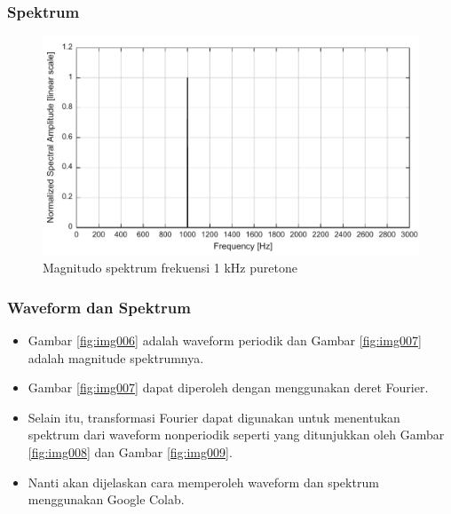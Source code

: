 \documentclass[pdflatex,compress]{beamer}
\begin{document}
\begin{frame}
	\frametitle{Spektrum}
	\begin{figure}
		\centering
		\includegraphics[width=0.7\linewidth]{img/img005}
		\caption{Magnitudo spektrum frekuensi 1 kHz puretone}
		\label{fig:img005}
	\end{figure}
\end{frame}

\begin{frame}
	\frametitle{Waveform dan Spektrum}
	\begin{itemize}
		\item Gambar \ref{fig:img006} adalah waveform periodik dan Gambar \ref{fig:img007} adalah magnitude spektrumnya.
		\item Gambar \ref{fig:img007} dapat diperoleh dengan menggunakan deret Fourier.
		\item Selain itu, transformasi Fourier dapat digunakan untuk menentukan spektrum dari waveform nonperiodik seperti yang ditunjukkan oleh Gambar \ref{fig:img008} dan Gambar \ref{fig:img009}.
		\item Nanti akan dijelaskan cara memperoleh waveform dan spektrum menggunakan Google Colab.
	\end{itemize}
\end{frame}
\end{document}

